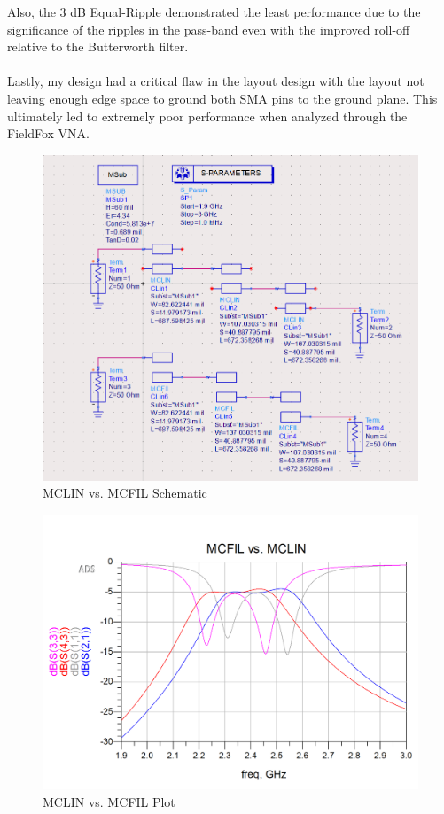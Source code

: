 \documentclass{article}
\begin{document}
Also, the 3 dB Equal-Ripple demonstrated the least performance due to the significance of the ripples in the pass-band even with the improved roll-off relative to the Butterworth filter.\\
\text{ }\\ 

Lastly, my design had a critical flaw in the layout design with the layout not leaving enough edge space to ground both SMA pins to the ground plane. This ultimately led to extremely poor performance when analyzed through the FieldFox VNA.
\newpage

\begin{figure}[h!]
    \centering
    \includegraphics[scale=0.4]{images/mcfil_vs_mclin_schematic.png}
    \caption{MCLIN vs. MCFIL Schematic}
    \label{fig:14}
\end{figure}
\begin{figure}[h!]
    \centering
    \includegraphics[scale=0.25]{images/mcfil_vs_mclin_plot.png}
    \caption{MCLIN vs. MCFIL Plot}
    \label{fig:15}
\end{figure}
\end{document}
